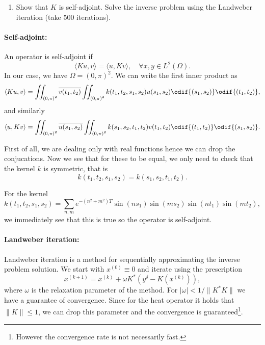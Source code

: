 \nopagebreak
\noindent\hrulefill

\begin{enumerate}[resume, label = (\alph*)]
    \item Show that $K$ is self-adjoint. Solve the inverse problem using the Landweber iteration (take 500 iterations).
\end{enumerate}

\nopagebreak
\noindent\hrulefill

\paragraph{Self-adjoint:}%
\label{par:self-adjoint}

An operator is self-adjoint if \[
    \langle Ku, v \rangle = \langle u, Kv \rangle, \quad \forall x,y \in L^2(\Omega).
\] 
In our case, we have \(\Omega = \left(0, \pi  \right)^2\).
We can write the first inner product as \[
    \langle Ku, v \rangle = \iint_{\left(0, \pi  \right)^2} \overline{v(t_1, t_2)} \iint_{\left(0, \pi  \right)^2}
    k(t_1, t_2, s_1, s_2) u(s_1, s_2) \odif{{ (s_1,s_2) }}\odif{{ (t_1,t_2) }},
\] and similarly \[
    \langle u, Kv \rangle = \iint_{\left(0, \pi  \right)^2} \overline{u(s_1, s_2)} \iint_{\left(0, \pi  \right)^2}
    k(s_1, s_2,t_1, t_2) v(t_1, t_2) \odif{{ (t_1,t_2) }}\odif{{ (s_1,s_2) }}.
\] 

First of all, we are dealing only with real functions hence we can drop the conjucations.
Now we see that for these to be equal, we only need to check that the kernel \(k\) is symmetric, that is \[
    k(t_1, t_2, s_1, s_2) = k(s_1, s_2, t_1, t_2).
\] 

For the kernel \[
    k(t_1,t_2,s_1,s_2) = \sum_{n,m} e^{-(n^2+m^2)T}\sin(ns_1)\sin(ms_2)\sin(nt_1)\sin(mt_2),
\] we immediately see that this is true so the operator is self-adjoint.

\paragraph{Landweber iteration:}%
\label{par:landweber-iteration}

Landweber iteration is a method for sequentially approximating the inverse problem solution. We start with \(x^{(0)}
    \equiv 0 \) and iterate using the prescription
    \[
        x^{\left(k+1  \right)} = x^{\left(k  \right)} + \omega K^{*}\left(y^{\delta} - K(x^{\left(k  \right)})  \right),
    \] where \(\omega\) is the relaxation parameter of the method.
For \(|\omega| < 1/\|K^{*}K\|\) we have a guarantee of convergence.
Since for the heat operator it holds that \(\|K\| \le 1\), we can drop this parameter and the convergence is
    guaranteed\footnote{However the convergence rate is not necessarily fast.}.

